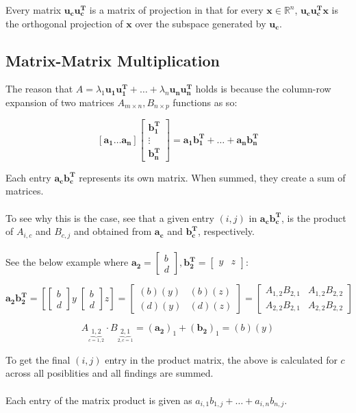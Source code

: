 \documentclass[12pt]{article}
\newcommand{\R}{\mathbb{R}}
\newcommand{\bm}[1]{\mathbf{{#1}}}
\newcommand{\mb}{\begin{bmatrix}}
\newcommand{\me}{\end{bmatrix}}
\begin{document}
Every matrix $\bm{u_c u_c^T}$ is a matrix of projection in that for every $\bm{x} \in \R^n$, $\bm{u_c u_c^Tx}$ is the orthogonal projection of $\bm{x}$
over the subspace generated by $\bm{u_c}$.

\subsection*{Matrix-Matrix Multiplication}

The reason that $A = \lambda_1 \bm{u_1 u_1^T} + \dots + \lambda_n\bm{u_n u_n^T}$ holds is because the column-row expansion of two matrices $A_{m \times n}, B_{n \times p}$ functions as so:

$$[\bm{a_1} \dots \bm{a_n}] \mb \bm{b_1^T} \\ \vdots \\ \bm{b_n^T} \me = \bm{a_1 b_1^T} + \dots + \bm{a_n b_n^T}$$

Each entry $\bm{a_c b_c^T}$ represents its own matrix. When summed, they create a sum of matrices. \\ \\

To see why this is the case, see that a given entry $(i,j)$ in $\bm{a_c} \bm{b_c^T}$, is the product of
$A_{i,c}$ and $B_{c,j}$  and obtained from $\bm{a_c}$ and $\bm{b_c^T}$, respectively. \\ \\

See the below example where $\bm{a_2} = \mb b \\ d \me, \bm{b_2^T} = \mb y & z \me$:

$$\bm{a_2 b_2^T} = [\mb b \\ d \me y \; \mb b \\ d \me z] = \mb (b)(y) & (b)(z) \\ (d)(y) & (d)(z) \me = \mb A_{1,2} B_{2,1} & A_{1,2} B_{2,2} \\ A_{2,2} B_{2,1} & A_{2,2} B_{2,2} \me$$

$$A_{\underbrace{1,2}_{c=1,2}} \cdot B_{\underbrace{2,1}_{2,c=1}} = (\bm{a_2})_1 + (\bm{b_2})_1 = (b)(y)$$

To get the final $(i,j)$ entry in the product matrix, the above is calculated for $c$ across all posiblities
and all findings are summed. \\ \\

Each entry of the matrix product is given as $a_{i,1}b_{1,j} + \dots + a_{i,n}b_{n,j}$. \\ \\
\end{document}

